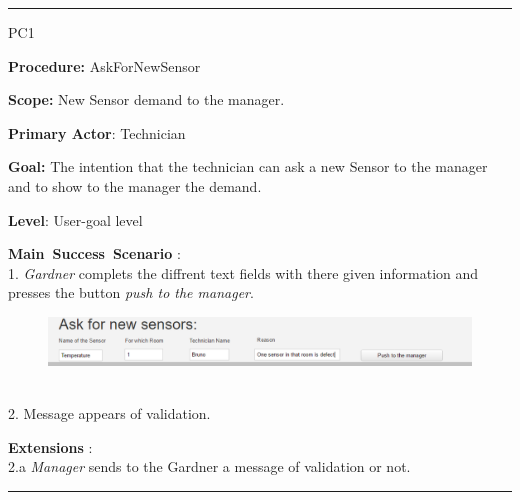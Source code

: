 \vspace{0.5cm}
\hrule
\hfill \break
\begin{lyxlist}{PC1}
\small{
\item [\textbf{Procedure:}] AskForNewSensor
\item [\textbf{Scope:}] New Sensor demand to the manager.
\item [\textbf{Primary Actor}:] Technician
\item [\textbf{Goal:}] The intention that the technician can ask a new Sensor to
the manager and to show to the manager the demand.
\item [\textbf{Level}:] User-goal level
\item [\textbf{Main~Success~Scenario}]:\\
1. \emph{Gardner} complets the diffrent text fields with there given
information and presses the button \emph{push to the manager}. 
\begin{figure}
\includegraphics[width=1\textwidth]{images/AskForSensor.eps}
\end{figure} \\
2. Message appears of validation.
 \begin{figure}

\end{figure}
\item [\textbf{Extensions}]:\\
2.a  \emph{Manager} sends to the Gardner a message of
validation or not.\\
}
\end{lyxlist}
\hrule
\vspace{0.5cm}

\break

